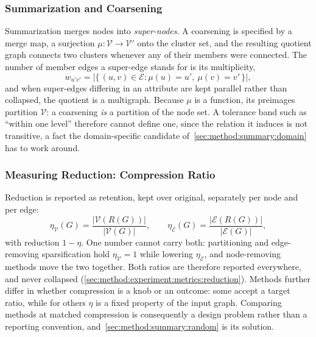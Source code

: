 \subsubsection{Summarization and Coarsening}
\label{sec:prelim:reduction:summarization}
Summarization merges nodes into \emph{super-nodes}. A coarsening is specified by a merge
map, a surjection $\mu \colon \mathcal{V} \rightarrow \mathcal{V}'$ onto the cluster set,
and the resulting quotient graph connects two clusters whenever any of their members were
connected. The number of member edges a super-edge stands for is its multiplicity,
\begin{equation}
    w_{u'v'} = \bigl| \{\, (u, v) \in \mathcal{E} :
        \mu(u) = u',\ \mu(v) = v' \,\} \bigr|,
    \label{eq:prelim:multiplicity}
\end{equation}
and when super-edges differing in an attribute are kept parallel rather than collapsed,
the quotient is a multigraph. Because $\mu$ is a function, its preimages partition
$\mathcal{V}$: a coarsening \emph{is} a partition of the node set. A tolerance band such
as ``within one level'' therefore cannot define one, since the relation it induces is not
transitive, a fact the domain-specific candidate of~\ref{sec:method:summary:domain} has
to work around.

\subsubsection{Measuring Reduction: Compression Ratio}
\label{sec:prelim:reduction:measuring}
Reduction is reported as retention, kept over original, separately per node and per edge:
\begin{equation}
    \eta_{\mathcal{V}}(G) =
        \frac{\left| \mathcal{V}(R(G)) \right|}{\left| \mathcal{V}(G) \right|},
    \qquad
    \eta_{\mathcal{E}}(G) =
        \frac{\left| \mathcal{E}(R(G)) \right|}{\left| \mathcal{E}(G) \right|},
    \label{eq:prelim:retention}
\end{equation}
with reduction $1 - \eta$. One number cannot carry both: partitioning and edge-removing
sparsification hold $\eta_{\mathcal{V}} = 1$ while lowering $\eta_{\mathcal{E}}$, and
node-removing methods move the two together. Both ratios are therefore reported
everywhere, and never collapsed (\ref{sec:method:experiment:metrics:reduction}). Methods
further differ in whether compression is a knob or an outcome: some accept a target
ratio, while for others $\eta$ is a fixed property of the input graph. Comparing methods
at matched compression is consequently a design problem rather than a reporting
convention, and~\ref{sec:method:summary:random} is its solution.

